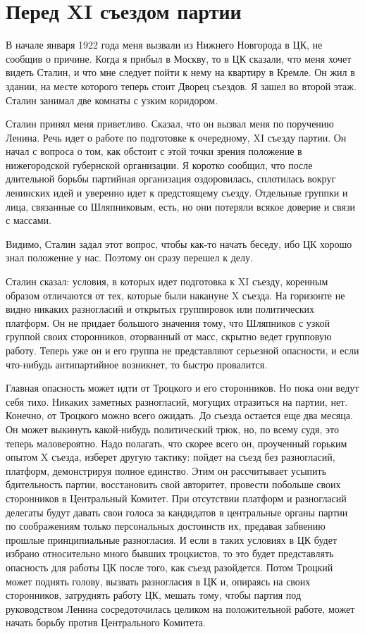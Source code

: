 \documentclass[12pt, a4paper, openany]{book}
\begin{document}
\newpage
\section[Перед XI съездом партии]{\center \textbf{Перед XI съездом партии}}


В начале января 1922 года меня вызвали из Нижнего Новгорода в ЦК, не сообщив о причине. Когда я прибыл в Москву, то в ЦК сказали, что меня хочет видеть Сталин, и что мне следует пойти к нему на квартиру в Кремле. Он жил в здании, на месте которого теперь стоит Дворец съездов. Я зашел во второй этаж. Сталин занимал две комнаты с узким коридором.

Сталин принял меня приветливо. Сказал, что он вызвал меня по поручению Ленина. Речь идет о работе по подготовке к очередному, XI съезду партии. Он начал с вопроса о том, как обстоит с этой точки зрения положение в нижегородской губернской организации. Я коротко сообщил, что после длительной борьбы партийная организация оздоровилась, сплотилась вокруг ленинских идей и уверенно идет к предстоящему съезду. Отдельные группки и лица, связанные со Шляпниковым, есть, но они потеряли всякое доверие и связи с массами.

Видимо, Сталин задал этот вопрос, чтобы как-то начать беседу, ибо ЦК хорошо знал положение у нас. Поэтому он сразу перешел к делу.

Сталин сказал: условия, в которых идет подготовка к XI съезду, коренным образом отличаются от тех, которые были накануне X съезда. На горизонте не видно никаких разногласий и открытых группировок или политических платформ. Он не придает большого значения тому, что Шляпников с узкой группой своих сторонников, оторванный от масс, скрытно ведет групповую работу. Теперь уже он и его группа не представляют серьезной опасности, и если что-нибудь антипартийное возникнет, то быстро провалится.

Главная опасность может идти от Троцкого и его сторонников. Но пока они ведут себя тихо. Никаких заметных разногласий, могущих отразиться на партии, нет. Конечно, от Троцкого можно всего ожидать. До съезда остается еще два месяца. Он может выкинуть какой-нибудь политический трюк, но, по всему судя, это теперь маловероятно. Надо полагать, что скорее всего он, проученный горьким опытом X съезда, изберет другую тактику: пойдет на съезд без разногласий, платформ, демонстрируя полное единство. Этим он рассчитывает усыпить бдительность партии, восстановить свой авторитет, провести побольше своих сторонников в Центральный Комитет. При отсутствии платформ и разногласий делегаты будут давать свои голоса за кандидатов в центральные органы партии по соображениям только персональных достоинств их, предавая забвению прошлые принципиальные разногласия. И если в таких условиях в ЦК будет избрано относительно много бывших троцкистов, то это будет представлять опасность для работы ЦК после того, как съезд разойдется. Потом Троцкий может поднять голову, вызвать разногласия в ЦК и, опираясь на своих сторонников, затруднять работу ЦК, мешать тому, чтобы партия под руководством Ленина сосредоточилась целиком на положительной работе, может начать борьбу против Центрального Комитета.
\end{document}
